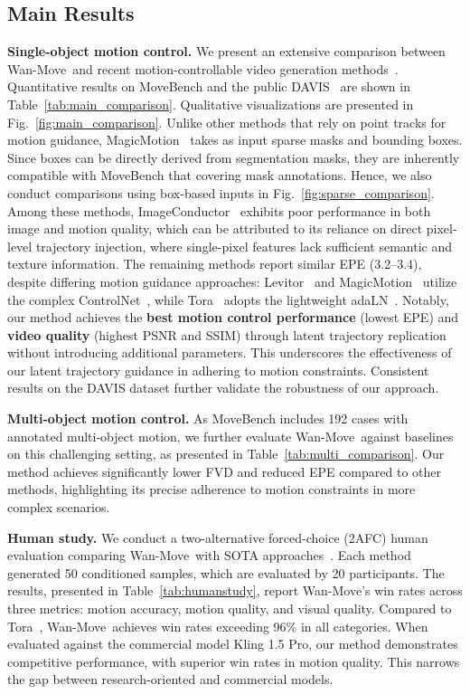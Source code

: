 \documentclass{article}
\newcommand{\method}{Wan-Move}
\begin{document}
\subsection{Main Results}
\noindent \textbf{Single-object motion control.}
We present an extensive comparison between \method~and recent motion-controllable video generation methods~\cite{li2025image,wang2024levitor,zhang2024tora,li2025magicmotion,kuaishou2024kling}.
Quantitative results on MoveBench and the public DAVIS~\cite{pont2017davis} are shown in Table~\ref{tab:main_comparison}.
Qualitative visualizations are presented in Fig.~\ref{fig:main_comparison}.
% 
Unlike other methods that rely on point tracks for motion guidance, MagicMotion~\cite{li2025magicmotion} takes as input sparse masks and bounding boxes. Since boxes can be directly derived from segmentation masks, they are inherently compatible with MoveBench that covering mask annotations.
Hence, we also conduct comparisons using box-based inputs in Fig.~\ref{fig:sparse_comparison}.
Among these methods, ImageConductor~\cite{li2025image} exhibits poor performance in both image and motion quality, which can be attributed to its reliance on direct pixel-level trajectory injection, where single-pixel features lack sufficient semantic and texture information.
The remaining methods report similar EPE (3.2–3.4), despite differing motion guidance approaches: Levitor~\cite{wang2024levitor} and MagicMotion~\cite{li2025magicmotion} utilize the complex ControlNet~\cite{controlnet}, while Tora~\cite{zhang2024tora} adopts the lightweight adaLN~\cite{dit}.
Notably, our method achieves the \textbf{best motion control performance} (lowest EPE) and \textbf{video quality} (highest PSNR and SSIM) through latent trajectory replication without introducing additional parameters. This underscores the effectiveness of our latent trajectory guidance in adhering to motion constraints. Consistent results on the DAVIS dataset further validate the robustness of our approach.


\noindent \textbf{Multi-object motion control.}
As MoveBench includes 192 cases with annotated multi-object motion, we further evaluate \method~against baselines~\cite{li2025image,zhang2024tora} on this challenging setting, as presented in Table~\ref{tab:multi_comparison}. Our method achieves significantly lower FVD and reduced EPE compared to other methods, highlighting its precise adherence to motion constraints in more complex scenarios.

\noindent \textbf{Human study.}
We conduct a two-alternative forced-choice (2AFC) human evaluation comparing \method~with SOTA approaches~\cite{zhang2024tora,kuaishou2024kling,wang2024levitor,li2025magicmotion}. Each method generated 50 conditioned samples, which are evaluated by 20 participants. The results, presented in Table~\ref{tab:humanstudy}, report \method's win rates across three metrics: motion accuracy, motion quality, and visual quality.
% 
Compared to Tora~\cite{zhang2024tora}, \method~achieves win rates exceeding 96\% in all categories. When evaluated against the commercial model Kling 1.5 Pro, our method demonstrates competitive performance, with superior win rates in motion quality. This narrows the gap between research-oriented and commercial models.
\end{document}
